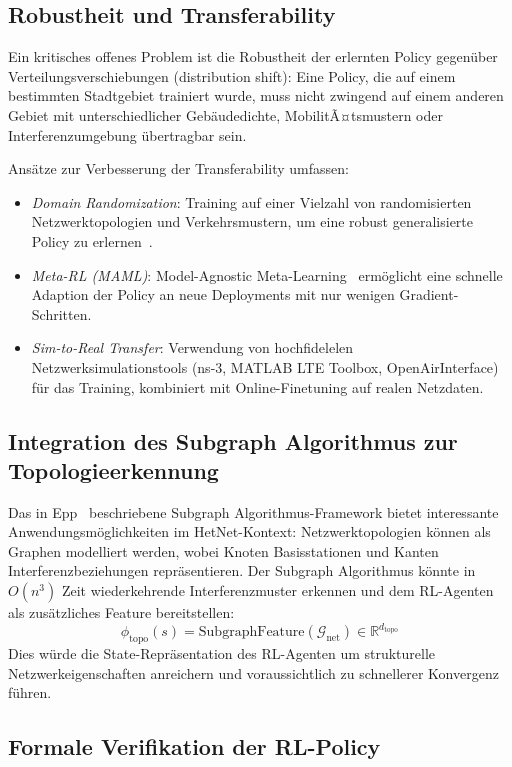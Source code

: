 ﻿\documentclass[a4paper,12pt]{article}
\theoremstyle{definition}
\begin{document}
\subsection{Robustheit und Transferability}

Ein kritisches offenes Problem ist die Robustheit der erlernten Policy gegen\"uber
Verteilungsverschiebungen (distribution shift): Eine Policy, die auf einem bestimmten
Stadtgebiet trainiert wurde, muss nicht zwingend auf einem anderen Gebiet mit
unterschiedlicher Geb\"audedichte, MobilitÃ¤tsmustern oder Interferenzumgebung
\"ubertragbar sein.

Ans\"atze zur Verbesserung der Transferability umfassen:
\begin{itemize}
  \item \emph{Domain Randomization}: Training auf einer Vielzahl von randomisierten
    Netzwerktopologien und Verkehrsmustern, um eine robust generalisierte Policy zu erlernen~\cite{tobin2017}.
  \item \emph{Meta-RL (MAML)}: Model-Agnostic Meta-Learning~\cite{finn2017} erm\"oglicht
    eine schnelle Adaption der Policy an neue Deployments mit nur wenigen Gradient-Schritten.
  \item \emph{Sim-to-Real Transfer}: Verwendung von hochfidelelen Netzwerksimulationstools
    (ns-3, MATLAB LTE Toolbox, OpenAirInterface) f\"ur das Training, kombiniert mit
    Online-Finetuning auf realen Netzdaten.
\end{itemize}

\subsection{Integration des Subgraph Algorithmus zur Topologieerkennung}

Das in Epp~\cite{epp2026sub} beschriebene Subgraph Algorithmus-Framework bietet
interessante Anwendungsm\"oglichkeiten im HetNet-Kontext: Netzwerktopologien k\"onnen
als Graphen modelliert werden, wobei Knoten Basisstationen und Kanten Interferenzbeziehungen
repr\"asentieren. Der Subgraph Algorithmus k\"onnte in $O(n^3)$ Zeit wiederkehrende
Interferenzmuster erkennen und dem RL-Agenten als zus\"atzliches Feature bereitstellen:
\[
  \phi_{\mathrm{topo}}(s) = \mathrm{SubgraphFeature}(\mathcal{G}_{\mathrm{net}})
  \in \mathbb{R}^{d_{\mathrm{topo}}}
\]
Dies w\"urde die State-Repr\"asentation des RL-Agenten um strukturelle Netzwerkeigenschaften
anreichern und voraussichtlich zu schnellerer Konvergenz f\"uhren.

\subsection{Formale Verifikation der RL-Policy}
\end{document}
